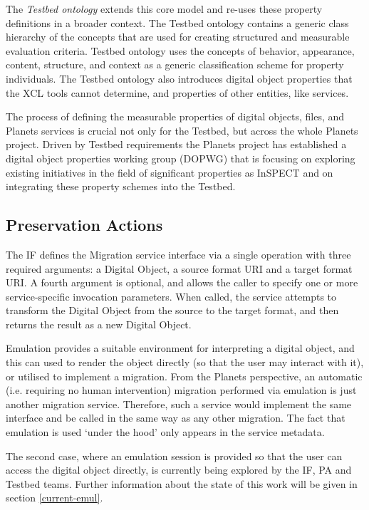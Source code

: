 \documentclass{article}
\begin{document}
The \emph{Testbed ontology} extends this core model and re-uses these property
definitions in a broader context. The Testbed ontology contains a generic class
hierarchy of the concepts that are used for creating structured and measurable
evaluation criteria. Testbed ontology uses the concepts of behavior, appearance,
content, structure, and context \cite{rothbik1999} as a generic classification
scheme for property individuals. The Testbed ontology also introduces digital
object properties that the XCL tools cannot determine, and properties of other
entities, like services.

The process of defining the measurable properties of digital objects, files, and
Planets services is crucial not only for the Testbed, but across the whole
Planets project. Driven by Testbed requirements the Planets project has
established a digital object properties working group (DOPWG) that is focusing on
exploring existing initiatives in the field of significant properties as InSPECT
\cite{inspect} and on integrating these property schemes into the Testbed.

\subsection{Preservation Actions}
\label{ss-pa}
The IF defines the Migration service interface via a single operation with three
required arguments: a Digital Object, a source format URI and a target format
URI. A fourth argument is optional, and allows the caller to specify one or more
service-specific invocation parameters. When called, the service attempts to
transform the Digital Object from the source to the target format, and then
returns the result as a new Digital Object.

Emulation provides a suitable environment for interpreting a digital object, and
this can used to render the object directly (so that the user may interact with
it), or utilised to implement a migration. From the Planets perspective, an
automatic (i.e. requiring no human intervention) migration performed via
emulation is just another migration service. Therefore, such a service would
implement the same interface and be called in the same way as any other
migration.  The fact that emulation is used `under the hood' only appears in the
service metadata.

The second case, where an emulation session is provided so that the user can
access the digital object directly, is currently being explored by the IF, PA and
Testbed teams.  Further information about the state of this work will be given in
section \ref{current-emul}.
\end{document}
